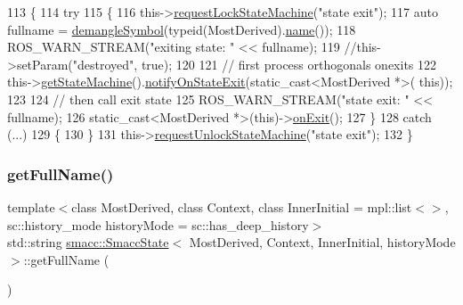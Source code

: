 \begin{DoxyCode}
113   \{
114     \textcolor{keywordflow}{try}
115     \{
116       this->\hyperlink{classsmacc_1_1ISmaccState_ae733140761345e027713bd622d93bf0f}{requestLockStateMachine}(\textcolor{stringliteral}{"state exit"});
117       \textcolor{keyword}{auto} fullname = \hyperlink{namespacesmacc_1_1introspection_a2f495108db3e57604d8d3ff5ef030302}{demangleSymbol}(\textcolor{keyword}{typeid}(MostDerived).\hyperlink{namespaceinteractive__marker_a447655961b3d3ca3c5a2a9d3d769436d}{name}());
118       ROS\_WARN\_STREAM(\textcolor{stringliteral}{"exiting state: "} << fullname);
119       \textcolor{comment}{//this->setParam("destroyed", true);}
120 
121       \textcolor{comment}{// first process orthogonals onexits}
122       this->\hyperlink{classsmacc_1_1SmaccState_afc39f8e0ca4001b2159a100da2fccd0e}{getStateMachine}().\hyperlink{classsmacc_1_1ISmaccStateMachine_a9d2bd4aca0c80a1ec22c5f95e7c38db8}{notifyOnStateExit}(static\_cast<MostDerived *>(\textcolor{keyword}{
      this}));
123 
124       \textcolor{comment}{// then call exit state}
125       ROS\_WARN\_STREAM(\textcolor{stringliteral}{"state exit: "} << fullname);
126       \textcolor{keyword}{static\_cast<}MostDerived *\textcolor{keyword}{>}(\textcolor{keyword}{this})->\hyperlink{classsmacc_1_1SmaccState_a82ca7c69153e86dc5eedf3f909560f3a}{onExit}();
127     \}
128     \textcolor{keywordflow}{catch} (...)
129     \{
130     \}
131     this->\hyperlink{classsmacc_1_1ISmaccState_a3bf006f25d5b9c0534c8e89ae2e93d40}{requestUnlockStateMachine}(\textcolor{stringliteral}{"state exit"});
132   \}
\end{DoxyCode}
\mbox{\label{classsmacc_1_1SmaccState_a897dbdfe52a8b944d4bf1844ddcc3aa5}} 
\subsubsection{\texorpdfstring{get\+Full\+Name()}{getFullName()}}
{\footnotesize\ttfamily template$<$class Most\+Derived, class Context, class Inner\+Initial = mpl\+::list$<$$>$, sc\+::history\+\_\+mode history\+Mode = sc\+::has\+\_\+deep\+\_\+history$>$ \\
std\+::string \hyperlink{classsmacc_1_1SmaccState}{smacc\+::\+Smacc\+State}$<$ Most\+Derived, Context, Inner\+Initial, history\+Mode $>$\+::get\+Full\+Name (\begin{DoxyParamCaption}{ }\end{DoxyParamCaption})\hspace{0.3cm}{\ttfamily [inline]}}



